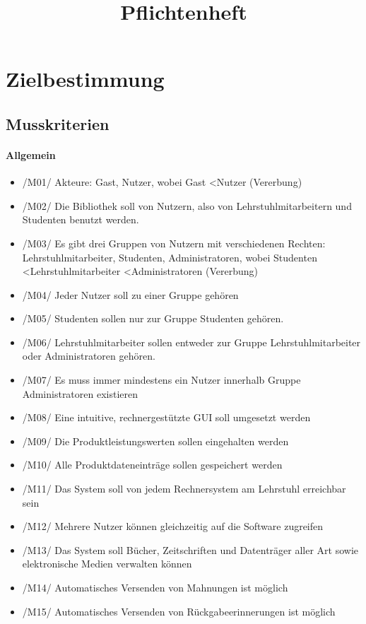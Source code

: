 \documentclass[12pt, a4paper]{article}
\title{Pflichtenheft}
\begin{document}
\maketitle
\pagebreak
\tableofcontents
\pagebreak

\section{Zielbestimmung}
\subsection{Musskriterien}
\paragraph{Allgemein}
\begin{itemize}
	\item /M01/ Akteure: Gast, Nutzer, wobei Gast \textless Nutzer (Vererbung)
	\item /M02/ Die Bibliothek soll von Nutzern, also von Lehrstuhlmitarbeitern und Studenten benutzt werden.
	\item /M03/ Es gibt drei Gruppen von Nutzern mit verschiedenen Rechten: Lehrstuhlmitarbeiter, Studenten, Administratoren, wobei Studenten \textless Lehrstuhlmitarbeiter \textless Administratoren (Vererbung)
	\item /M04/ Jeder Nutzer soll zu einer Gruppe gehören
	\item /M05/ Studenten sollen nur zur Gruppe Studenten gehören.
	\item /M06/ Lehrstuhlmitarbeiter sollen entweder zur Gruppe Lehrstuhlmitarbeiter oder Administratoren gehören.
	\item /M07/ Es muss immer mindestens ein Nutzer innerhalb Gruppe Administratoren existieren
	\item /M08/ Eine intuitive, rechnergestützte GUI soll umgesetzt werden
	\item /M09/ Die Produktleistungswerten sollen eingehalten werden
	\item /M10/ Alle Produktdateneinträge sollen gespeichert werden
	\item /M11/ Das System soll von jedem Rechnersystem am Lehrstuhl erreichbar sein
	\item /M12/ Mehrere Nutzer können gleichzeitig auf die Software zugreifen
	\item /M13/ Das System soll Bücher, Zeitschriften und Datenträger aller Art sowie elektronische Medien verwalten können
	\item /M14/ Automatisches Versenden von Mahnungen ist möglich
	\item /M15/ Automatisches Versenden von Rückgabeerinnerungen ist möglich
\end{itemize}
\end{document}
